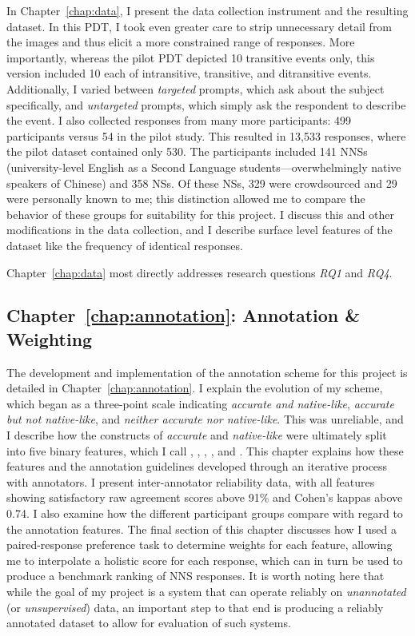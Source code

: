 In Chapter~\ref{chap:data}, I present the data collection instrument and the resulting dataset. In this PDT, I took even greater care to strip unnecessary detail from the images and thus elicit a more constrained range of responses. More importantly, whereas the pilot PDT depicted 10 transitive events only, this version included 10 each of intransitive, transitive, and ditransitive events. Additionally, I varied between \textit{targeted} prompts, which ask about the subject specifically, and \textit{untargeted} prompts, which simply ask the respondent to describe the event. I also collected responses from many more participants: 499 participants versus 54 in the pilot study. This resulted in 13,533 responses, where the pilot dataset contained only 530. The participants included 141 NNSs (university-level English as a Second Language students---overwhelmingly native speakers of Chinese) and 358 NSs. Of these NSs, 329 were crowdsourced and 29 were personally known to me; this distinction allowed me to compare the behavior of these groups for suitability for this project. I discuss this and other modifications in the data collection, and I describe surface level features of the dataset like the frequency of identical responses.

Chapter~\ref{chap:data} most directly addresses research questions \textit{RQ1} and \textit{RQ4}.

\subsection{Chapter~\ref{chap:annotation}: Annotation \& Weighting}

The development and implementation of the annotation scheme for this project is detailed in Chapter~\ref{chap:annotation}. I explain the evolution of my scheme, which began as a three-point scale indicating \textit{accurate and native-like}, \textit{accurate but not native-like}, and \textit{neither accurate nor native-like}. This was unreliable, and I describe how the constructs of \textit{accurate} and \textit{native-like} were ultimately split into five binary features, which I call , , , , and . This chapter explains how these features and the annotation guidelines developed through an iterative process with annotators. I present inter-annotator reliability data, with all features showing satisfactory raw agreement scores above 91\% and Cohen's kappas above 0.74. I also examine how the different participant groups compare with regard to the annotation features. The final section of this chapter discusses how I used a paired-response preference task to determine weights for each feature, allowing me to interpolate a holistic score for each response, which can in turn be used to produce a benchmark ranking of NNS responses. It is worth noting here that while the goal of my project is a system that can operate reliably on \textit{unannotated} (or \textit{unsupervised}) data, an important step to that end is producing a reliably annotated dataset to allow for evaluation of such systems.

